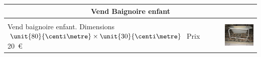 \documentclass{petiteannonce}
\begin{document}
{%
  \begin{tabular}%
{m{}m{}m{}}
    \multicolumn{3}{c}{\Large \dotfill Vend Baignoire enfant \dotfill }\\
    \hline\\
    Vend baignoire enfant.\newline 
    Dimensions \(\unit {80}{\centi \metre }\times \unit 
    {30}{\centi \metre }\)\newline
    Prix 20~\euro
    && 
    \includegraphics{baignoire.jpg}
  \end{tabular}
}
\end{document}
